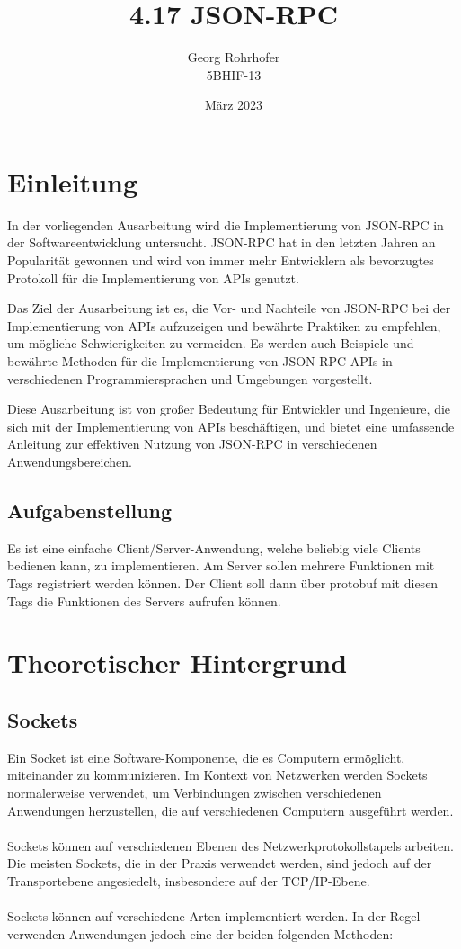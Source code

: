 \documentclass[german,oneside,color]{htldipl}
\title{4.17 JSON-RPC}
\author{Georg Rohrhofer \\ 5BHIF-13}
\date{März 2023}
\begin{document}
\tableofcontents
\newpage

\chapter{Einleitung}
In der vorliegenden Ausarbeitung wird die Implementierung von JSON-RPC in der Softwareentwicklung untersucht. JSON-RPC hat in den letzten Jahren an Popularität gewonnen und wird von immer mehr Entwicklern als bevorzugtes Protokoll für die Implementierung von APIs genutzt.

Das Ziel der Ausarbeitung ist es, die Vor- und Nachteile von JSON-RPC bei der Implementierung von APIs aufzuzeigen und bewährte Praktiken zu empfehlen, um mögliche Schwierigkeiten zu vermeiden. Es werden auch Beispiele und bewährte Methoden für die Implementierung von JSON-RPC-APIs in verschiedenen Programmiersprachen und Umgebungen vorgestellt.

Diese Ausarbeitung ist von großer Bedeutung für Entwickler und Ingenieure, die sich mit der Implementierung von APIs beschäftigen, und bietet eine umfassende Anleitung zur effektiven Nutzung von JSON-RPC in verschiedenen Anwendungsbereichen.

\section{Aufgabenstellung}
Es ist eine einfache Client/Server-Anwendung, welche beliebig viele Clients bedienen kann, zu implementieren. Am Server sollen mehrere Funktionen mit Tags registriert werden können. Der Client soll dann über protobuf mit diesen Tags die Funktionen des Servers aufrufen können. 


\chapter{Theoretischer Hintergrund}
\section{Sockets}
Ein Socket ist eine Software-Komponente, die es Computern ermöglicht, miteinander zu kommunizieren. Im Kontext von Netzwerken werden Sockets normalerweise verwendet, um Verbindungen zwischen verschiedenen Anwendungen herzustellen, die auf verschiedenen Computern ausgeführt werden.
\\
\\
Sockets können auf verschiedenen Ebenen des Netzwerkprotokollstapels arbeiten. Die meisten Sockets, die in der Praxis verwendet werden, sind jedoch auf der Transportebene angesiedelt, insbesondere auf der TCP/IP-Ebene.
\\
\\
Sockets können auf verschiedene Arten implementiert werden. In der Regel verwenden Anwendungen jedoch eine der beiden folgenden Methoden:
\end{document}
